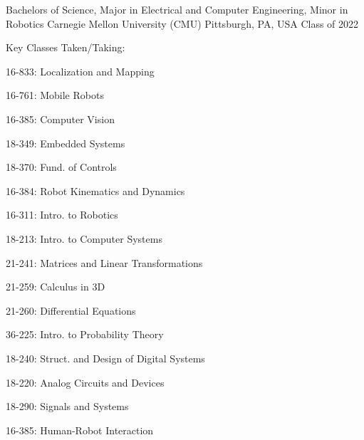 \begin{cventries}
\cventry
{Bachelors of Science, Major in Electrical and Computer Engineering, Minor in Robotics} %
{Carnegie Mellon University (CMU)} %
{Pittsburgh, PA, USA} %
{Class of 2022} %
{ %
	Key Classes Taken/Taking:\smallskip
	\begin{cvitems}
	\begin{multicols}{2}[]
        \item 16-833: Localization and Mapping 
        \item 16-761: Mobile Robots 
        \item 16-385: Computer Vision 
        \item 18-349: Embedded Systems 
        \item 18-370: Fund. of Controls 
        \item 16-384: Robot Kinematics and Dynamics 
        \item 16-311: Intro. to Robotics 
		\item 18-213: Intro. to Computer Systems 
		\item 21-241: Matrices and Linear Transformations 
		\item 21-259: Calculus in 3D 
        \item 21-260: Differential Equations 
        \item 36-225: Intro. to Probability Theory 
        \item 18-240: Struct. and Design of Digital Systems 
        \item 18-220: Analog Circuits and Devices 
        \item 18-290: Signals and Systems 
        \item 16-385: Human-Robot Interaction 
	\end{multicols}
	\end{cvitems}
}


\end{cventries}